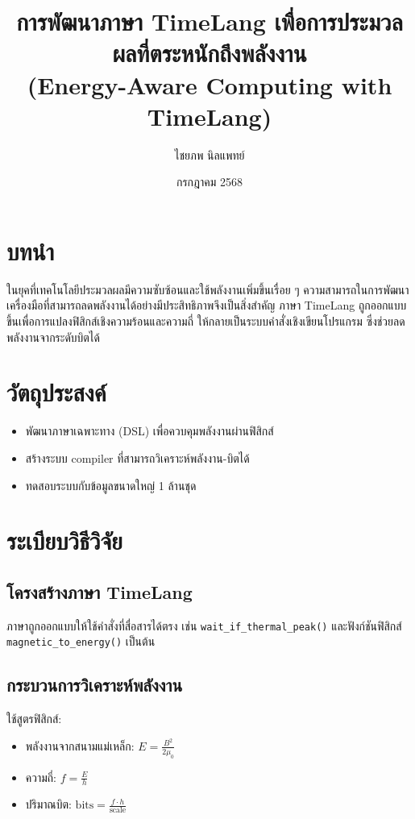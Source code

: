 \documentclass[12pt]{article}
\title{\Huge การพัฒนาภาษา TimeLang เพื่อการประมวลผลที่ตระหนักถึงพลังงาน \\[1em]
\Large (Energy-Aware Computing with TimeLang)}
\author{\Large ไชยภพ นิลแพทย์}
\date{\Large กรกฎาคม 2568}
\begin{document}
\maketitle
\newpage

\tableofcontents
\newpage

\section{บทนำ}
ในยุคที่เทคโนโลยีประมวลผลมีความซับซ้อนและใช้พลังงานเพิ่มขึ้นเรื่อย ๆ ความสามารถในการพัฒนาเครื่องมือที่สามารถลดพลังงานได้อย่างมีประสิทธิภาพจึงเป็นสิ่งสำคัญ ภาษา TimeLang ถูกออกแบบขึ้นเพื่อการแปลงฟิสิกส์เชิงความร้อนและความถี่ ให้กลายเป็นระบบคำสั่งเชิงเขียนโปรแกรม ซึ่งช่วยลดพลังงานจากระดับบิตได้

\section{วัตถุประสงค์}
\begin{itemize}
\item พัฒนาภาษาเฉพาะทาง (DSL) เพื่อควบคุมพลังงานผ่านฟิสิกส์
\item สร้างระบบ compiler ที่สามารถวิเคราะห์พลังงาน-บิตได้
\item ทดสอบระบบกับข้อมูลขนาดใหญ่ 1 ล้านชุด
\end{itemize}

\section{ระเบียบวิธีวิจัย}
\subsection{โครงสร้างภาษา TimeLang}
ภาษาถูกออกแบบให้ใช้คำสั่งที่สื่อสารได้ตรง เช่น \texttt{wait\_if\_thermal\_peak()} และฟังก์ชันฟิสิกส์ \texttt{magnetic\_to\_energy()} เป็นต้น

\subsection{กระบวนการวิเคราะห์พลังงาน}
ใช้สูตรฟิสิกส์:
\begin{itemize}
\item พลังงานจากสนามแม่เหล็ก: $E = \frac{B^2}{2\mu_0}$
\item ความถี่: $f = \frac{E}{h}$
\item ปริมาณบิต: $\text{bits} = \frac{f \cdot h}{\text{scale}}$
\end{itemize}
\end{document}
